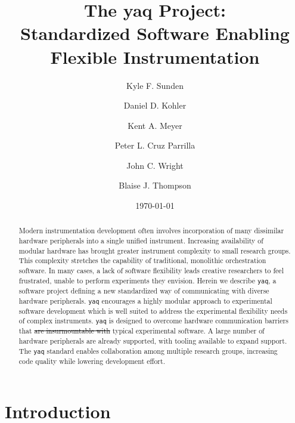 \documentclass[aip, amsmath, amssymb, reprint,]{revtex4-2}
\newcommand\yaq{\texttt{yaq}}
\providecommand{\DIFaddtex}[1]{{\protect\color{blue}\uwave{#1}}} %
\providecommand{\DIFdeltex}[1]{{\protect\color{red}\sout{#1}}}                      %
\providecommand{\DIFaddbegin}{} %
\providecommand{\DIFaddend}{} %
\providecommand{\DIFdelbegin}{} %
\providecommand{\DIFdelend}{} %
\providecommand{\DIFadd}[1]{\texorpdfstring{\DIFaddtex{#1}}{#1}} %
\providecommand{\DIFdel}[1]{\texorpdfstring{\DIFdeltex{#1}}{}} %
\newcommand{\DIFscaledelfig}{0.5}
\newlength{\DIFdelgraphicswidth} %
\newlength{\DIFdelgraphicsheight} %
\newcommand{\DIFaddincludegraphics}[2][]{{\color{blue}\fbox{\DIFOincludegraphics[#1]{#2}}}} %
\newcommand{\DIFdelincludegraphics}[2][]{%
\sbox{\DIFdelgraphicsbox}{\DIFOincludegraphics[#1]{#2}}%
\settoboxwidth{\DIFdelgraphicswidth}{\DIFdelgraphicsbox} %
\settoboxtotalheight{\DIFdelgraphicsheight}{\DIFdelgraphicsbox} %
\scalebox{\DIFscaledelfig}{%
\parbox[b]{\DIFdelgraphicswidth}{\usebox{\DIFdelgraphicsbox}\\[-\baselineskip] \rule{\DIFdelgraphicswidth}{0em}}\llap{\resizebox{\DIFdelgraphicswidth}{\DIFdelgraphicsheight}{%
\setlength{\unitlength}{\DIFdelgraphicswidth}%
\begin{picture}(1,1)%
\thicklines\linethickness{2pt} %
{\color[rgb]{1,0,0}\put(0,0){\framebox(1,1){}}}%
{\color[rgb]{1,0,0}\put(0,0){\line( 1,1){1}}}%
{\color[rgb]{1,0,0}\put(0,1){\line(1,-1){1}}}%
\end{picture}%
}\hspace*{3pt}}} %
} %
\DeclareRobustCommand{\DIFaddbegin}{\DIFOaddbegin \let\includegraphics\DIFaddincludegraphics} %
\DeclareRobustCommand{\DIFaddend}{\DIFOaddend \let\includegraphics\DIFOincludegraphics} %
\DeclareRobustCommand{\DIFdelbegin}{\DIFOdelbegin \let\includegraphics\DIFdelincludegraphics} %
\DeclareRobustCommand{\DIFdelend}{\DIFOaddend \let\includegraphics\DIFOincludegraphics} %
\begin{document}

\title{The yaq Project: \\ Standardized Software Enabling Flexible Instrumentation}
\author{Kyle F. Sunden}
\author{Daniel D. Kohler}
\author{Kent A. Meyer}
\author{Peter L. Cruz Parrilla}
\author{John C. Wright}
\author{Blaise J. Thompson}

\date{\today}

\begin{abstract}

Modern instrumentation development often involves incorporation of many dissimilar hardware peripherals into a single unified instrument.
Increasing availability of modular hardware has brought greater instrument complexity to small research groups.
This complexity stretches the capability of traditional, monolithic orchestration software.
In many cases, a lack of software flexibility leads creative researchers to feel frustrated, unable to perform experiments they envision.
Herein we describe \yaq{}, a software project defining a new standardized way of communicating with diverse hardware peripherals.
\yaq{} encourages a highly modular approach to experimental software development which is well suited to address the experimental flexibility needs of complex instruments.
\yaq{} is designed to overcome hardware communication barriers that \DIFdelbegin \DIFdel{are insurmountable with }\DIFdelend \DIFaddbegin \DIFadd{challenge }\DIFaddend typical experimental software.
A large number of hardware peripherals are already supported, with tooling available to expand support.
The \yaq{} standard enables collaboration among multiple research groups, increasing code quality while lowering development effort.

\end{abstract}

\maketitle

\section{Introduction}
\end{document}
